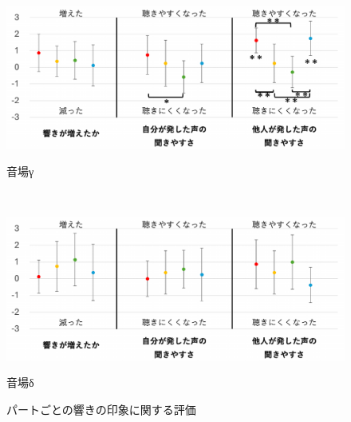 \documentclass[11pt,a4j]{jreport}
\begin{document}
\begin{figure}[H]
\begin{minipage}{1\linewidth}
    \centering
    \includegraphics[scale=.55]{images/subjectiveExp/statisticAnalysis/part_reverb_c.pdf}
    \caption*{音場γ}
    \label{fig:響きの印象γ}
  \end{minipage}
  \\
  \vspace{1\baselineskip}
  \begin{minipage}{1\linewidth}
    \centering
    \includegraphics[scale=.55]{images/subjectiveExp/statisticAnalysis/part_reverb_d.pdf}
    \caption*{音場δ}
    \label{fig:響きの印象δ}
  \end{minipage}
  
  \caption{パートごとの響きの印象に関する評価}
  \label{fig:パートごとの響きの印象に関する評価}
\end{figure}


\newpage
\end{document}
